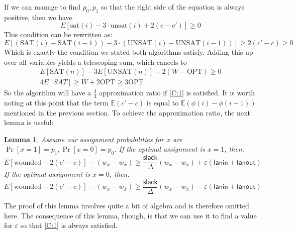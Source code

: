 \documentclass[11pt,letter]{article}
\newtheorem{lemma}[theorem]{Lemma}
\numberwithin{theorem}{section}
\begin{document}
If we can manage to find $p_0,p_1$ so that the right side of the equation is always positive, then we have
\begin{equation}
E[\textrm{sat}(i) - 3\cdot\textrm{unsat}(i)+ 2(c-c')] \ge 0 \label{C:1}
\end{equation}
This condition can be rewritten as:
\begin{equation}
E[(\textrm{SAT}(i) - \textrm{SAT}(i-1)) - 3\cdot(\textrm{UNSAT}(i) - \textrm{UNSAT}(i-1))] \ge  2(c'-c) \ge 0
\end{equation}
Which is exactly the condition we stated both algorithms satisfy. Adding this up over all variables yields a telescoping sum, which cancels to
\begin{eqnarray}
E[\textrm{SAT}(n)] - 3E[\textrm{UNSAT}(n)] - 2(W-\textrm{OPT}) \ge 0
\\4E[SAT] \ge W + 2\textrm{OPT} \ge 3\textrm{OPT}
\end{eqnarray}
So the algorithm will have a $\frac{3}{4}$ approximation ratio if \ref{C:1} is satisfied. It is worth noting at this point that the term $\mathbb{E}(c'-c)$ is equal to 
$\mathbb{E}(\phi(i) - \phi(i-1))$ mentioned in the previous section. To achieve the approximation ratio, the next lemma is useful:
\begin{lemma} \label{L:3}
Assume our assignment probabilities for $x$ are $\Pr[x = 1] = p_1, \Pr[x=0] = p_0$. If the optimal assignment is $x=1$, then:
\[E[\textrm{wounded} - 2(c'-c)] - (w_x - w_{\bar{x}}) \ge \frac{\mathsf{slack}}{\Delta}(w_x - w_{\bar{x}}) + \varepsilon(\mathsf{fanin} + \mathsf{fanout})\]
If the optimal assignment is  $x=0$, then:
\[E[\textrm{wounded} - 2(c'-c)] - (w_x - w_{\bar{x}}) \ge \frac{\mathsf{slack}}{\Delta}(w_x - w_{\bar{x}}) - \varepsilon(\mathsf{fanin} + \mathsf{fanout})\]
\end{lemma}
The proof of this lemma involves quite a bit of algebra and is therefore omitted here. The consequence of this lemma, though, is that we can use it to find a value for $\varepsilon$ so that  \ref{C:1} is always satisfied.
\end{document}
